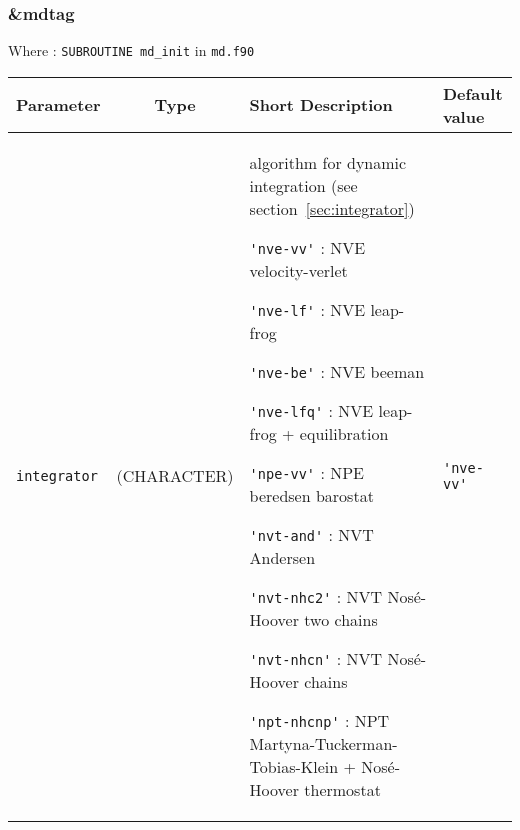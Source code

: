\documentclass[a4paper,8pt]{article}
\begin{document}
\subsubsection{\&mdtag}

Where : \verb?SUBROUTINE md_init? in \verb?md.f90?
\newline

\begin{longtable}{l|c|m{8cm}|m{2cm}}
\hline
\hline
Parameter        &  Type              &          Short Description                                                          & Default value \\
\hline
\hline
\rule[-0.75cm]{0cm}{1.5cm}
\verb?integrator?& (CHARACTER)        &  \newline algorithm for dynamic integration (see section~\ref{sec:integrator}) \newline                   

                                         \verb?'nve-vv'?    : NVE velocity-verlet \newline
					  
					 \verb?'nve-lf'?    : NVE leap-frog \newline
					   
				         \verb?'nve-be'?    : NVE beeman \newline

					 \verb?'nve-lfq'?   : NVE leap-frog +  equilibration \newline                        

					 \verb?'npe-vv'?    : NPE beredsen barostat \newline                        
					 
					 \verb?'nvt-and'?   : NVT Andersen \newline
					 
					 \verb?'nvt-nhc2'?  : NVT Nosé-Hoover two chains \newline

					 \verb?'nvt-nhcn'?  : NVT Nosé-Hoover chains \newline

					 \verb?'npt-nhcnp'? : NPT Martyna-Tuckerman-Tobias-Klein + Nosé-Hoover thermostat \newline 
                                                                                                                            & \verb?'nve-vv'? \tabularnewline
					 

\end{longtable}
\end{document}
